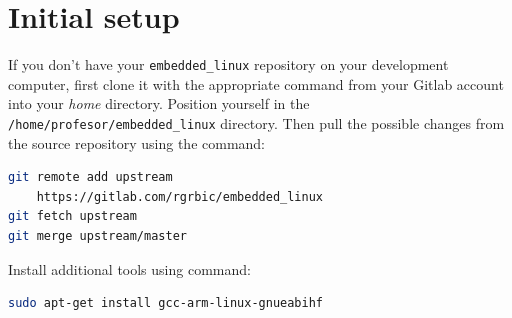 \documentclass[11pt]{article}
\begin{document}
\section{Initial setup}
If you don't have your \texttt{embedded\_linux} repository on your development
 computer, first clone it with the appropriate command from your Gitlab account
 into your \textit{home} directory. Position yourself in the\\
 \texttt{/home/profesor/embedded\_linux} directory. Then pull the possible changes
 from the source repository using the command:
\begin{lstlisting}[language=bash]
git remote add upstream
	https://gitlab.com/rgrbic/embedded_linux
git fetch upstream
git merge upstream/master
\end{lstlisting}
Install additional tools using command:
\begin{lstlisting}[language=bash]
sudo apt-get install gcc-arm-linux-gnueabihf
\end{lstlisting}
\end{document}
